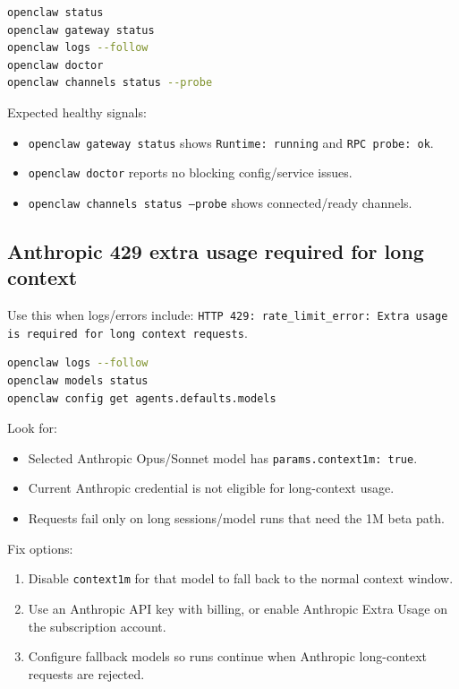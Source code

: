 \begin{lstlisting}[language=bash]
openclaw status
openclaw gateway status
openclaw logs --follow
openclaw doctor
openclaw channels status --probe
\end{lstlisting}


Expected healthy signals:

\begin{itemize}
  \item \texttt{openclaw gateway status} shows \texttt{Runtime: running} and \texttt{RPC probe: ok}.
  \item \texttt{openclaw doctor} reports no blocking config/service issues.
  \item \texttt{openclaw channels status --probe} shows connected/ready channels.
\end{itemize}


\subsection{Anthropic 429 extra usage required for long context}


Use this when logs/errors include:
\texttt{HTTP 429: rate\_limit\_error: Extra usage is required for long context requests}.

\begin{lstlisting}[language=bash]
openclaw logs --follow
openclaw models status
openclaw config get agents.defaults.models
\end{lstlisting}


Look for:

\begin{itemize}
  \item Selected Anthropic Opus/Sonnet model has \texttt{params.context1m: true}.
  \item Current Anthropic credential is not eligible for long-context usage.
  \item Requests fail only on long sessions/model runs that need the 1M beta path.
\end{itemize}


Fix options:

\begin{enumerate}
  \item Disable \texttt{context1m} for that model to fall back to the normal context window.
  \item Use an Anthropic API key with billing, or enable Anthropic Extra Usage on the subscription account.
  \item Configure fallback models so runs continue when Anthropic long-context requests are rejected.
\end{enumerate}


